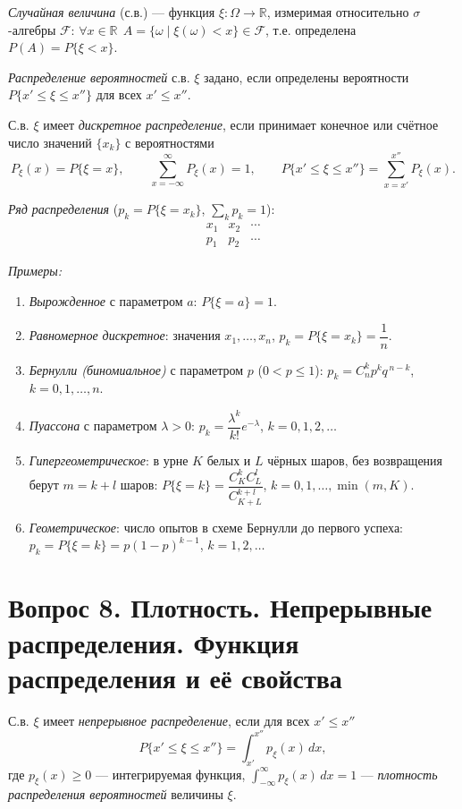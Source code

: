 \textit{Случайная величина} (с.в.) — функция $\xi\colon\Omega\to\mathbb{R}$, измеримая относительно $\sigma$-алгебры $\mathcal{F}$: $\forall x\in\mathbb{R}\ \ A=\{\omega\mid\xi(\omega)<x\}\in\mathcal{F}$, т.е. определена $P(A)=P\{\xi<x\}$.

\textit{Распределение вероятностей} с.в. $\xi$ задано, если определены вероятности $P\{x'\le\xi\le x''\}$ для всех $x'\le x''$.

С.в. $\xi$ имеет \textit{дискретное распределение}, если принимает конечное или счётное число значений $\{x_k\}$ с вероятностями
\[ P_\xi(x)=P\{\xi=x\},\qquad \sum_{x=-\infty}^{\infty}P_\xi(x)=1,\qquad P\{x'\le\xi\le x''\}=\sum_{x=x'}^{x''}P_\xi(x). \]

\textit{Ряд распределения} ($p_k=P\{\xi=x_k\}$, $\sum_k p_k=1$):
\[
\begin{array}{c|c|c|c}
 x_1 & x_2 & \cdots \\ \hline
 p_1 & p_2 & \cdots
\end{array}
\]

\textit{Примеры:}
\begin{enumerate}
  \item \textit{Вырожденное} с параметром $a$: $P\{\xi=a\}=1$.
  \item \textit{Равномерное дискретное}: значения $x_1,\dots,x_n$, $p_k=P\{\xi=x_k\}=\dfrac1n$.
  \item \textit{Бернулли (биномиальное)} с параметром $p$ ($0<p\le1$): $p_k=C_n^k p^k q^{\,n-k}$, $k=0,1,\dots,n$.
  \item \textit{Пуассона} с параметром $\lambda>0$: $p_k=\dfrac{\lambda^k}{k!}e^{-\lambda}$, $k=0,1,2,\dots$
  \item \textit{Гипергеометрическое}: в урне $K$ белых и $L$ чёрных шаров, без возвращения берут $m=k+l$ шаров: $P\{\xi=k\}=\dfrac{C_K^k C_L^l}{C_{K+L}^{k+l}}$, $k=0,1,\dots,\min(m,K)$.
  \item \textit{Геометрическое}: число опытов в схеме Бернулли до первого успеха: $p_k=P\{\xi=k\}=p(1-p)^{k-1}$, $k=1,2,\dots$
\end{enumerate}

\section*{Вопрос 8. Плотность. Непрерывные распределения. Функция распределения и её свойства}

С.в. $\xi$ имеет \textit{непрерывное распределение}, если для всех $x'\le x''$
\[ P\{x'\le\xi\le x''\}=\int_{x'}^{x''}p_\xi(x)\,dx, \]
где $p_\xi(x)\ge0$ — интегрируемая функция, $\int_{-\infty}^{\infty}p_\xi(x)\,dx=1$ — \textit{плотность распределения вероятностей} величины $\xi$.

